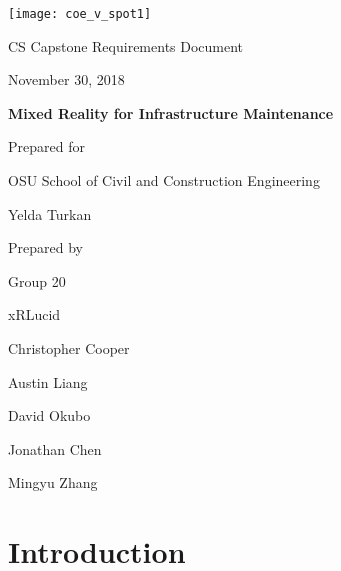\documentclass[onecolumn, draftclsnofoot,10pt, compsoc]{IEEEtran}
\def \CapstoneTeamName{		xRLucid}
\def \CapstoneTeamNumber{		20}
\def \GroupMemberOne{			Christopher Cooper}
\def \GroupMemberTwo{			Austin Liang}
\def \GroupMemberThree{			David Okubo}
\def \GroupMemberFour{			Jonathan Chen}
\def \GroupMemberFive{			Mingyu Zhang}
\def \CapstoneProjectName{		Mixed Reality for Infrastructure Maintenance}
\def \CapstoneSponsorCompany{	OSU School of Civil and Construction Engineering}
\def \CapstoneSponsorPerson{		Yelda Turkan}
\def \DocType{	%
				Requirements Document
				}
\newcommand{\NameSigPair}[1]{\par
\makebox[2.75in][r]{#1} \hfil 	\makebox[3.25in]{\makebox[2.25in]{\hrulefill} \hfill		\makebox[.75in]{\hrulefill}}
\par\vspace{-12pt} \textit{\tiny\noindent
\makebox[2.75in]{} \hfil		\makebox[3.25in]{\makebox[2.25in][r]{Signature} \hfill	\makebox[.75in][r]{Date}}}}
\renewcommand{\NameSigPair}[1]{#1}
\begin{document}
\begin{titlepage}
    \begin{singlespace}
    	\texttt{[image: coe\_v\_spot1]}
        \hfill
        \par\vspace{.2in}
        \centering
        \scshape{
            \huge CS Capstone \DocType \par
            {\large November 30, 2018}\par
            \vspace{.5in}
            \textbf{\Huge\CapstoneProjectName}\par
            \vfill
            {\large Prepared for}\par
            \Huge \CapstoneSponsorCompany\par
            \vspace{5pt}
            {\Large\NameSigPair{\CapstoneSponsorPerson}\par}
            {\large Prepared by }\par
            Group\CapstoneTeamNumber\par
            \CapstoneTeamName\par
            \vspace{5pt}
            {\Large
                \NameSigPair{\GroupMemberOne}\par
                \NameSigPair{\GroupMemberTwo}\par
                \NameSigPair{\GroupMemberThree}\par
                \NameSigPair{\GroupMemberFour}\par
                \NameSigPair{\GroupMemberFive}\par
            }
            \vspace{20pt}
        }

\end{singlespace}
\end{titlepage}
\newpage
{}
\tableofcontents
\listoffigures
\clearpage

\section{Introduction}
\end{document}
